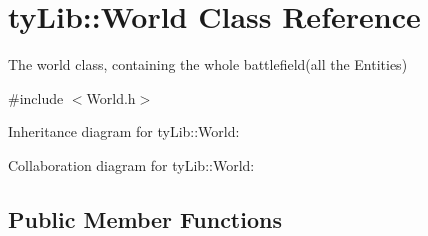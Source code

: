 \hypertarget{classty_lib_1_1_world}{}\section{ty\+Lib\+:\+:World Class Reference}
\label{classty_lib_1_1_world}


The world class, containing the whole battlefield(all the Entities)  




{\ttfamily \#include $<$World.\+h$>$}



Inheritance diagram for ty\+Lib\+:\+:World\+:


Collaboration diagram for ty\+Lib\+:\+:World\+:
\subsection*{Public Member Functions}
